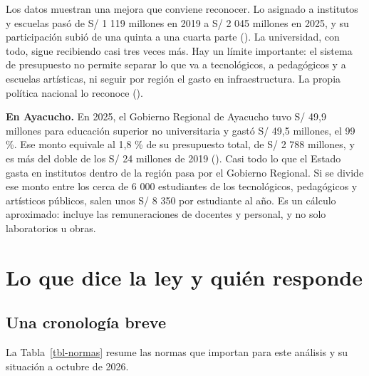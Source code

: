 \documentclass[
  jou,
  floatsintext,
  longtable,
  a4paper,
  nolmodern,
  notxfonts,
  notimes,
  12pt,
  colorlinks=true,linkcolor=blue,citecolor=blue,urlcolor=blue]{apa7}
\begin{document}
Los datos muestran una mejora que conviene reconocer. Lo asignado a
institutos y escuelas pasó de S/ 1 119 millones en 2019 a S/ 2 045
millones en 2025, y su participación subió de una quinta a una cuarta
parte
(). La universidad, con todo, sigue
recibiendo casi tres veces más. Hay un límite importante: el sistema de
presupuesto no permite separar lo que va a tecnológicos, a pedagógicos y
a escuelas artísticas, ni seguir por región el gasto en infraestructura.
La propia política nacional lo reconoce
().

\textbf{En Ayacucho.} En 2025, el Gobierno Regional de Ayacucho tuvo S/
49,9 millones para educación superior no universitaria y gastó S/ 49,5
millones, el 99 \%. Ese monto equivale al 1,8 \% de su presupuesto
total, de S/ 2 788 millones, y es más del doble de los S/ 24 millones de
2019
(). Casi todo lo que el Estado gasta en
institutos dentro de la región pasa por el Gobierno Regional. Si se
divide ese monto entre los cerca de 6 000 estudiantes de los
tecnológicos, pedagógicos y artísticos públicos, salen unos S/ 8 350 por
estudiante al año. Es un cálculo aproximado: incluye las remuneraciones
de docentes y personal, y no solo laboratorios u obras.

\section{Lo que dice la ley y quién
responde}\label{lo-que-dice-la-ley-y-quiuxe9n-responde}

\subsection{Una cronología breve}\label{una-cronologuxeda-breve}

La Tabla~\ref{tbl-normas} resume las normas que importan para este
análisis y su situación a octubre de 2026.
\end{document}
